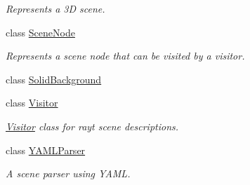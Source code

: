 \begin{DoxyCompactItemize}
\begin{DoxyCompactList}\small\item\em Represents a 3D scene. \end{DoxyCompactList}\item 
class \mbox{\hyperlink{classrayt_1_1_scene_node}{Scene\+Node}}
\begin{DoxyCompactList}\small\item\em Represents a scene node that can be visited by a visitor. \end{DoxyCompactList}\item 
class \mbox{\hyperlink{classrayt_1_1_solid_background}{Solid\+Background}}
\item 
class \mbox{\hyperlink{classrayt_1_1_visitor}{Visitor}}
\begin{DoxyCompactList}\small\item\em \mbox{\hyperlink{classrayt_1_1_visitor}{Visitor}} class for rayt scene descriptions. \end{DoxyCompactList}\item 
class \mbox{\hyperlink{classrayt_1_1_y_a_m_l_parser}{Y\+A\+M\+L\+Parser}}
\begin{DoxyCompactList}\small\item\em A scene parser using Y\+A\+ML. \end{DoxyCompactList}\end{DoxyCompactItemize}
